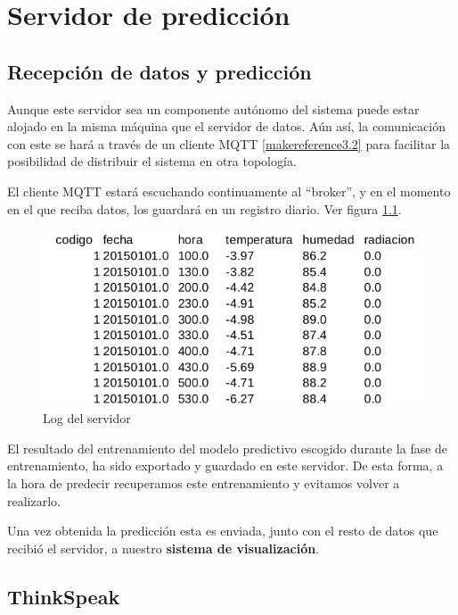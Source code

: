 \cleardoublepage

\chapter{Servidor de predicción}
\label{makereference5}

\section{Recepción de datos y predicción}

Aunque este servidor sea un componente autónomo del sistema puede estar alojado en la misma máquina que el servidor de datos. Aún así, la comunicación con este se hará a través de un cliente MQTT \ref{makereference3.2} para facilitar la posibilidad de distribuir el sistema en otra topología.

El cliente MQTT estará escuchando continuamente al ``broker'', y en el momento en el que reciba datos, los guardará en un registro diario. Ver figura \ref{log}.

	\begin{figure}[htb]
		\begin{center}
			\includegraphics[width=13cm]{figures/log.png}
			\caption{Log del servidor}
		\end{center}
		\label{log}
	\end{figure}

El resultado del entrenamiento del modelo predictivo escogido durante la fase de entrenamiento, ha sido exportado y guardado en este servidor. De esta forma, a la hora de predecir recuperamos este entrenamiento y evitamos volver a realizarlo.

Una vez obtenida la predicción esta es enviada, junto con el resto de datos que recibió el servidor, a nuestro \textbf{sistema de visualización}. 

\section{ThinkSpeak}

